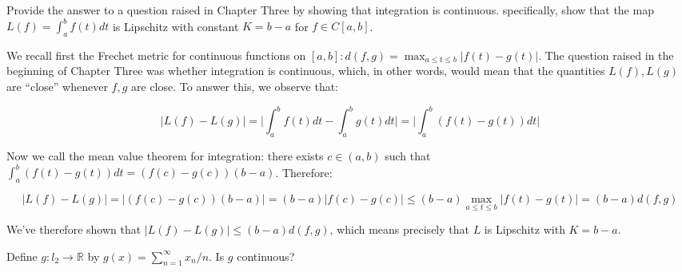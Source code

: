 \begin{exercise}{26}
    Provide the answer to a question raised in Chapter Three by showing that integration is continuous.
    specifically, show that the map $L(f) = \int_{a}^{b} f(t) dt$ is Lipschitz with constant $K = b - a$ for $f \in C[a, b]$.
\end{exercise}

\begin{solution}
    
    We recall first the Frechet metric for continuous functions on $[a, b]: d(f, g) = \max_{a \leq t \leq b} \lvert f(t) - g(t) \rvert$.
    The question raised in the beginning of Chapter Three was whether integration is continuous, which, in other words, would mean that the quantities $L(f), L(g)$ are ``close'' whenever $f, g$ are close.
    To answer this, we observe that:

    \[\lvert L(f) - L(g) \rvert = \Biggl\lvert \int_{a}^{b} f(t) dt - \int_{a}^{b} g(t) dt \Biggr\rvert = \Biggl\lvert \int_{a}^{b} (f(t) - g(t)) dt \Biggr\rvert\]

    Now we call the mean value theorem for integration: there exists $c \in (a, b)$ such that $\int_{a}^{b}(f(t) - g(t))dt = (f(c) - g(c))(b - a)$.
    Therefore:

    \[\lvert L(f) - L(g) \rvert = \lvert (f(c) - g(c))(b - a) \rvert = (b - a) \lvert f(c) - g(c) \rvert \leq (b - a) \max_{a \leq t \leq b} \lvert f(t) - g(t) \rvert = (b - a)d(f, g)\]
    
    We've therefore shown that $\lvert L(f) - L(g) \rvert \leq (b - a)d(f, g)$, which means precisely that $L$ is Lipschitz with $K = b - a$.
\end{solution}

\begin{exercise}{28}
    Define $g: l_2 \rightarrow \mathbb{R}$ by $g(x) = \sum_{n=1}^{\infty} x_n/n$.
    Is $g$ continuous?
\end{exercise}


